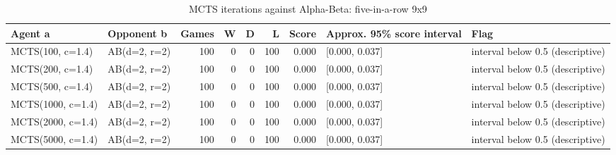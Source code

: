 \begin{table}[!t]
\centering
\caption{MCTS iterations against Alpha-Beta: five-in-a-row 9x9}
\label{tab:ab_ladder_gomoku9}
\small
\begin{tabular}{llrrrrrll}
\toprule
Agent a & Opponent b & Games & W & D & L & Score & Approx. 95\% score interval & Flag \\
\midrule
MCTS(100, c=1.4) & AB(d=2, r=2) & 100 & 0 & 0 & 100 & 0.000 & [0.000, 0.037] & interval below 0.5 (descriptive) \\
MCTS(200, c=1.4) & AB(d=2, r=2) & 100 & 0 & 0 & 100 & 0.000 & [0.000, 0.037] & interval below 0.5 (descriptive) \\
MCTS(500, c=1.4) & AB(d=2, r=2) & 100 & 0 & 0 & 100 & 0.000 & [0.000, 0.037] & interval below 0.5 (descriptive) \\
MCTS(1000, c=1.4) & AB(d=2, r=2) & 100 & 0 & 0 & 100 & 0.000 & [0.000, 0.037] & interval below 0.5 (descriptive) \\
MCTS(2000, c=1.4) & AB(d=2, r=2) & 100 & 0 & 0 & 100 & 0.000 & [0.000, 0.037] & interval below 0.5 (descriptive) \\
MCTS(5000, c=1.4) & AB(d=2, r=2) & 100 & 0 & 0 & 100 & 0.000 & [0.000, 0.037] & interval below 0.5 (descriptive) \\
\bottomrule
\end{tabular}
\end{table}

